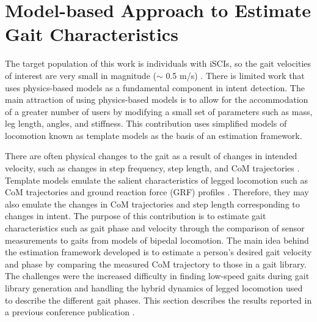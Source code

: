 \chapter{Model-based Approach to Estimate Gait Characteristics} \label{chapter:IMM}
The target population of this work is individuals with iSCIs, so the gait velocities of interest are very small in magnitude ($ \sim $ 0.5 m/s) \cite{nymark2005electromyographic}. There is limited work that uses physics-based models as a fundamental component in intent detection. The main attraction of using physics-based models is to allow for the accommodation of a greater number of users by modifying a small set of parameters such as mass, leg length, angles, and stiffness. This contribution uses simplified models of locomotion known as template models \cite{full1999templates} as the basis of an estimation framework.

There are often physical changes to the gait as a result of changes in intended velocity, such as changes in step frequency, step length, and CoM trajectories \cite{kuo2001simple}. Template models emulate the salient characteristics of legged locomotion such as CoM trajectories and ground reaction force (GRF) profiles \cite{mochon1980ballistic}. Therefore, they may also emulate the changes in CoM trajectories and step length corresponding to changes in intent. The purpose of this contribution is to estimate gait characteristics such as gait phase and velocity through the comparison of sensor measurements to gaits from models of bipedal locomotion. The main idea behind the estimation framework developed is to estimate a person's desired gait velocity and phase by comparing the measured CoM trajectory to those in a gait library. The challenges were the increased difficulty in finding low-speed gaits during gait library generation and handling the hybrid dynamics of legged locomotion used to describe the different gait phases. This section describes the results reported in a previous conference publication \cite{karulkarapplication}.
